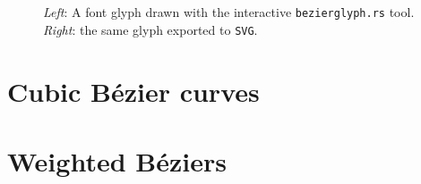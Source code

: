 \documentclass[12pt,openany,a4,usenames,dvipsnames]{book}
\begin{document}
\begin{figure}[H]
\begin{minipage}{0.49\textwidth}
  \end{minipage}\par
  \vspace{1em}
  {\noindent{}\emph{Left}: A font glyph drawn with the interactive \texttt{bezierglyph.rs} tool. \emph{Right}: the same glyph exported to \texttt{SVG}.}
\end{figure}
\clearpage{}
\section{Cubic Bézier curves}
\skelpar%
\section{Weighted Béziers}
\skelpar%
\end{document}
